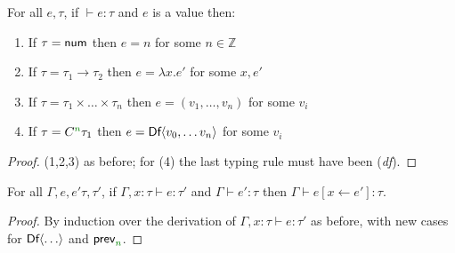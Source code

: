 \begin{lemma}
\label{thm:semantics-df-canon}
For all $e, \tau$, if $\vdash e : \tau$ and $e$ is a value then:
\begin{enumerate}
  \item If $\tau=\ident{num}$ then $e = n$ for some $n \in \mathbb{Z}$
  \item If $\tau=\tau_1 \rightarrow \tau_2$ then $e = \lambda x.e'$ for some $x, e'$
  \item If $\tau=\tau_1\times\ldots\times\tau_n$ then $e = (v_1, \ldots, v_n)$ for some $v_i$
  \item If $\tau=\ctyp{\cclrd{n}}\tau_1$ then $e = \ident{Df}\langle v_0, \ldots v_n\rangle$ for some $v_i$
\end{enumerate}  
\end{lemma}
\begin{proof}
  (1,2,3) as before; for (4) the last typing rule must have been (\emph{df}).
\end{proof}

\begin{lemma}
\label{thm:semantics-df-pres-subst}
For all $\Gamma, e, e' \tau, \tau'$, if $\Gamma, x:\tau \vdash e : \tau'$ and $\Gamma \vdash e' : \tau$ 
then $\Gamma \vdash e[x \leftarrow e'] : \tau$.
\end{lemma}
\begin{proof}
  By induction over the derivation of $\Gamma, x:\tau \vdash e : \tau'$ as before, with new
  cases for $\textnormal{\sffamily Df}\langle\ldots\rangle$ and $\ident{prev}_{\cclrd{n}}$.
\end{proof}

